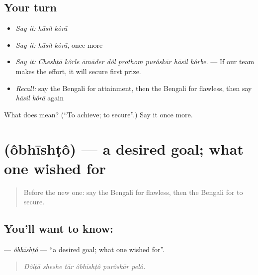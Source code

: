 \subsection*{Your turn}
\begin{itemize}
\raggedright
  \item \emph{Say it:} \emph{hāsil kôrā}
  \item \emph{Say it:} \emph{hāsil kôrā}, once more
  \item \emph{Say it:} \emph{Cheshṭā kôrle āmāder dôl prothom purôskār hāsil kôrbe.} — If our team makes the effort, it will secure first prize.
  \item \emph{Recall:} say the Bengali for attainment, then the Bengali for flawless, then say \emph{hāsil kôrā} again
\end{itemize}

\begin{tcolorbox}[breakable,colback=teal!4,colframe=teal!35!black,title={Before you move on}]
What does   mean? (\textquotedblleft{}To achieve; to secure\textquotedblright{}.) Say it once more.
\end{tcolorbox}
\section[\texorpdfstring{\bn{অভীষ্ট} (ôbhīshṭô)}{অভীষ্ট (ôbhīshṭô)}]{ (ôbhīshṭô) — a desired goal; what one wished for}

\label{lesson:BN-C543-obhishto}



\begin{quote}
Before the new one: say the Bengali for flawless, then the Bengali for to secure.
\end{quote}

\subsection*{You'll want to know: }
\textbf{} — \emph{ôbhīshṭô} — \textquotedblleft{}a desired goal; what one wished for\textquotedblright{}.

\begin{quote}
     
\end{quote}

\begin{quote}
\emph{Dôlṭā sheshe tār ôbhīshṭô purôskār pelô.}
\end{quote}

